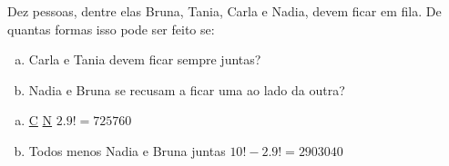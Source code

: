 \begin{ex}
 Dez pessoas, dentre elas Bruna, Tania, Carla e Nadia, devem ficar em fila. De quantas formas isso pode ser feito se:
    \begin{enumerate}[(a)]
    \item Carla e Tania devem ficar sempre juntas?
    \item Nadia e Bruna se recusam a ficar uma ao lado da outra?
    \end{enumerate}
    \begin{sol}
    
    \phantom{A} 
    \begin{enumerate}[(a)]
    
        \item \underline{C} \underline{N} \underline{\phantom{N}} \underline{\phantom{N}} \underline{\phantom{N}} \underline{\phantom{N}} \underline{\phantom{N}} \underline{\phantom{N}} \underline{\phantom{N}} \underline{\phantom{N}} \hspace{0.5cm}  $2.9! = 725760$
        
        \item Todos menos Nadia e Bruna juntas \hspace{0.5cm} $10! - 2.9! = 2903040$
        \end{enumerate}
    
    \end{sol}
    
\end{ex}